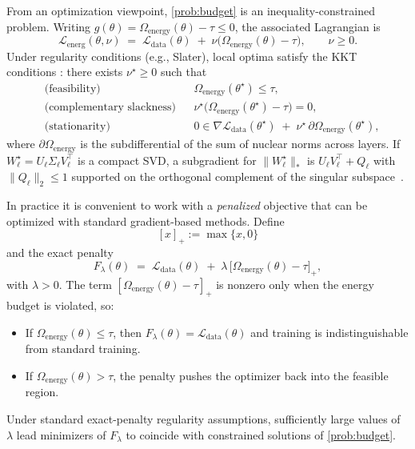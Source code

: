 \documentclass[a4paper,fleqn]{cas-sc}
\theoremstyle{remark}
\theoremstyle{definition}
\begin{document}
From an optimization viewpoint, \eqref{prob:budget} is an inequality-constrained problem. Writing $g(\theta)=\Omega_{\text{energy}}(\theta)-\tau\le 0$, the associated Lagrangian is
\begin{equation}\label{eq:lagrangiana-energia}
  \mathcal{L}_{\mathrm{energ}}(\theta,\nu)
    \;=\;
      \mathcal{L}_{\text{data}}(\theta) 
      \;+\; 
      \nu \bigl( \Omega_{\text{energy}}(\theta) - \tau \bigr),
  \qquad \nu \ge 0.
\end{equation}
Under regularity conditions (e.g., Slater), local optima satisfy the KKT conditions \cite{Rockafellar1976AugLag,Bertsekas1999Nonlinear}:
there exists $\nu^\star\ge 0$ such that
\begin{align}
  &\text{(feasibility)} && \Omega_{\text{energy}}(\theta^\star)\le \tau,\\
  &\text{(complementary slackness)} && \nu^\star\big(\Omega_{\text{energy}}(\theta^\star)-\tau\big)=0,\\
  &\text{(stationarity)} && 0\in \nabla \mathcal{L}_{\text{data}}(\theta^\star)\;+\;\nu^\star\,\partial \Omega_{\text{energy}}(\theta^\star),
\end{align}
where $\partial \Omega_{\text{energy}}$ is the subdifferential of the sum of nuclear norms across layers. If $W_\ell^\star=U_\ell\Sigma_\ell V_\ell^\top$ is a compact SVD, a subgradient for $\|W_\ell^\star\|_{\ast}$ is $U_\ell V_\ell^\top + Q_\ell$ with $\|Q_\ell\|_2\le 1$ supported on the orthogonal complement of the singular subspace~\cite{Watson1992Subdiff}.

In practice it is convenient to work with a \emph{penalized} objective that can be optimized with standard gradient-based methods. Define
\[
[x]_+ := \max\{x,0\}
\]
and the exact penalty
\begin{equation}\label{eq:problema-penalizado-energia}
  F_\lambda(\theta)
    \;=\;
    \mathcal{L}_{\text{data}}(\theta)
    \;+\;
    \lambda \,\bigl[ \Omega_{\text{energy}}(\theta) - \tau \bigr]_+,
\end{equation}
with $\lambda>0$. The term $[\Omega_{\text{energy}}(\theta)-\tau]_+$ is nonzero only when the energy budget is violated, so:
\begin{itemize}
  \item If $\Omega_{\text{energy}}(\theta) \le \tau$, then $F_\lambda(\theta) = \mathcal{L}_{\text{data}}(\theta)$ and training is indistinguishable from standard training.
  \item If $\Omega_{\text{energy}}(\theta) > \tau$, the penalty pushes the optimizer back into the feasible region.
\end{itemize}
Under standard exact-penalty regularity assumptions, sufficiently large values of $\lambda$ lead minimizers of $F_\lambda$ to coincide with constrained solutions  of \eqref{prob:budget}.
\end{document}
